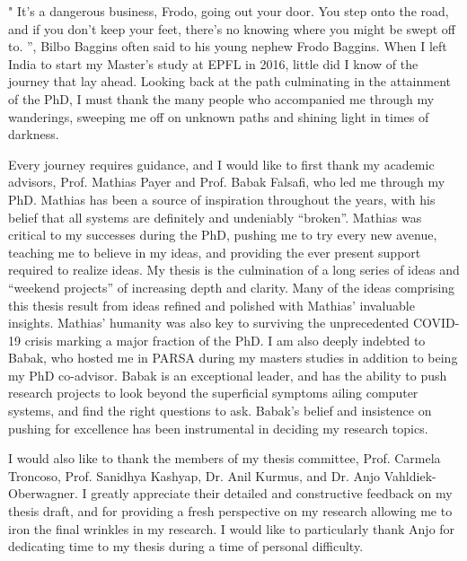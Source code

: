 "
It's a dangerous business, Frodo, going out your door. 
You step onto the road, and if you don't keep your feet, there's no knowing where you might be swept off to.
”, 
Bilbo Baggins often said to his young nephew Frodo Baggins. 
When I left India to start my Master's study at EPFL in 2016,
little did I know of the journey that lay ahead. 
Looking back at the path culminating in the attainment of the PhD, 
I must thank the many people who accompanied me through my wanderings, 
sweeping me off on unknown paths
and shining light  in times of darkness.

Every journey requires guidance, and I would like to first thank my academic advisors,
Prof. Mathias Payer and Prof. Babak Falsafi, who led me through my PhD.
Mathias has been a source of inspiration throughout the years,
with his belief that all systems are definitely and undeniably ``broken''.
Mathias was critical to my successes during the PhD, pushing me to try
every new avenue, teaching me to believe in my ideas, and providing the ever present
support required to realize ideas. 
My thesis is the culmination of a long series of ideas and ``weekend projects'' of 
increasing depth and clarity.
Many of the ideas comprising this thesis result from ideas refined and
polished with Mathias' invaluable insights.
Mathias' humanity was also key to surviving the unprecedented COVID-19 crisis
marking a major fraction of the PhD.
I am also deeply indebted to Babak, who hosted me in PARSA during my masters studies
in addition to being my PhD co-advisor. 
Babak is an exceptional leader, and has the ability to push research projects to look beyond the
superficial symptoms ailing computer systems, and find the right questions to ask.
Babak's belief and insistence on pushing for excellence has been instrumental in
deciding my research topics.

I would also like to thank the members of my
thesis committee, Prof. Carmela Troncoso, Prof. Sanidhya Kashyap, Dr. Anil Kurmus, 
and Dr. Anjo Vahldiek-Oberwagner.
I greatly appreciate their detailed and constructive feedback on my thesis draft,
and for providing a fresh perspective on my research allowing me to iron the final 
wrinkles in my research.
I would like to particularly thank Anjo for dedicating time to my thesis during a
time of personal difficulty.

